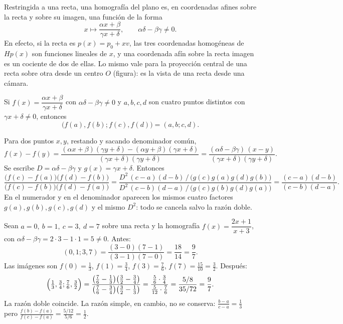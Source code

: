 Restringida a una recta, una homografía del plano es, en coordenadas afines sobre la recta
y sobre su imagen, una función de la forma
\[
  x\longmapsto \frac{\alpha x+\beta}{\gamma x+\delta},\qquad \alpha\delta-\beta\gamma\neq0 .
\]
En efecto, si la recta es \(p(x)=p_0+xv\), las tres coordenadas homogéneas de \(Hp(x)\) son
funciones lineales de \(x\), y una coordenada afín sobre la recta imagen es un cociente de
dos de ellas. Lo mismo vale para la proyección central de una recta sobre otra desde un
centro \(O\) (figura): es la vista de una recta desde una cámara.

\begin{proposicion}\label{prop:c1-razon-doble}
Si \(f(x)=\dfrac{\alpha x+\beta}{\gamma x+\delta}\) con \(\alpha\delta-\beta\gamma\neq0\) y
\(a,b,c,d\) son cuatro puntos distintos con \(\gamma x+\delta\neq0\), entonces
\[
  \bigl(f(a),f(b);f(c),f(d)\bigr)=(a,b;c,d).
\]
\end{proposicion}

\begin{demostracion}
Para dos puntos \(x,y\), restando y sacando denominador común,
\[
  f(x)-f(y)=\frac{(\alpha x+\beta)(\gamma y+\delta)-(\alpha y+\beta)(\gamma x+\delta)}
  {(\gamma x+\delta)(\gamma y+\delta)}
  =\frac{(\alpha\delta-\beta\gamma)\,(x-y)}{(\gamma x+\delta)(\gamma y+\delta)} .
\]
Se escribe \(D=\alpha\delta-\beta\gamma\) y \(g(x)=\gamma x+\delta\). Entonces
\[
  \frac{\bigl(f(c)-f(a)\bigr)\bigl(f(d)-f(b)\bigr)}{\bigl(f(c)-f(b)\bigr)\bigl(f(d)-f(a)\bigr)}
  =\frac{D^2\,(c-a)(d-b)\,\big/\,\bigl(g(c)g(a)g(d)g(b)\bigr)}
        {D^2\,(c-b)(d-a)\,\big/\,\bigl(g(c)g(b)g(d)g(a)\bigr)}
  =\frac{(c-a)(d-b)}{(c-b)(d-a)} .
\]
En el numerador y en el denominador aparecen los mismos cuatro factores
\(g(a),g(b),g(c),g(d)\) y el mismo \(D^2\): todo se cancela salvo la razón doble.
\end{demostracion}

\begin{ejemplo}\label{ej:c1-razon-doble}
Sean \(a=0,\ b=1,\ c=3,\ d=7\) sobre una recta y la homografía
\(f(x)=\dfrac{2x+1}{x+3}\), con \(\alpha\delta-\beta\gamma=2\cdot3-1\cdot1=5\neq0\).
Antes:
\[
  (0,1;3,7)=\frac{(3-0)(7-1)}{(3-1)(7-0)}=\frac{18}{14}=\frac97 .
\]
Las imágenes son \(f(0)=\tfrac13\), \(f(1)=\tfrac34\), \(f(3)=\tfrac76\), \(f(7)=\tfrac{15}{10}=\tfrac32\).
Después:
\[
  \Bigl(\tfrac13,\tfrac34;\tfrac76,\tfrac32\Bigr)
  =\frac{\bigl(\tfrac76-\tfrac13\bigr)\bigl(\tfrac32-\tfrac34\bigr)}
        {\bigl(\tfrac76-\tfrac34\bigr)\bigl(\tfrac32-\tfrac13\bigr)}
  =\frac{\tfrac56\cdot\tfrac34}{\tfrac5{12}\cdot\tfrac76}
  =\frac{5/8}{35/72}=\frac97 .
\]
La razón doble coincide. La razón simple, en cambio, no se conserva:
\(\frac{b-a}{c-a}=\frac13\) pero \(\frac{f(b)-f(a)}{f(c)-f(a)}=\frac{5/12}{5/6}=\frac12\).
\end{ejemplo}

